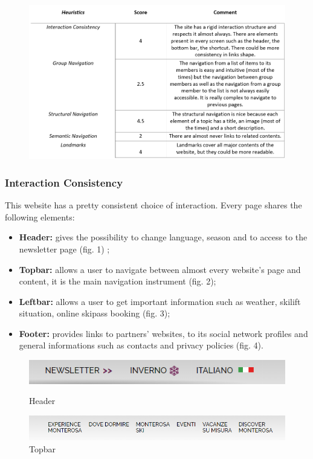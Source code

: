 \begin{figure}[h!]
	\centering
	\begin{minipage}[b]{1\textwidth}
    		\includegraphics[width=\textwidth]{./assets/navigation-final.PNG}
	\end{minipage}
\end{figure}
\FloatBarrier
\subsubsection{Interaction Consistency}
This website has a pretty consistent choice of interaction. Every page shares the following elements:
\begin{itemize}
	\item \textbf{Header:} gives the possibility to change language, season and to access to the newsletter page (fig. 1) ;
	\item \textbf{Topbar:} allows a user to navigate between almost every website's page and content, it is the main navigation 		instrument (fig. 2); 
	\item \textbf{Leftbar:} allows a user to get important information such as weather, skilift 	situation, online skipass booking (fig. 		3);
	\item \textbf{Footer:} provides links to partners' websites, to its social network profiles and general informations such as 			contacts and privacy policies (fig. 4).
\end{itemize}  

\begin{figure}[h!]
	\centering
	\begin{minipage}[b]{0.7\textwidth}
    		\includegraphics[width=\textwidth]{./assets/Interaction-header.png}
		\caption{Header}
	\end{minipage}
	\hfill
	\centering
	\begin{minipage}[b]{0.7\textwidth}
    		\includegraphics[width=\textwidth]{./assets/Interaction-topbar.png}
		\caption{Topbar}
	\end{minipage}
\end{figure}
\FloatBarrier

